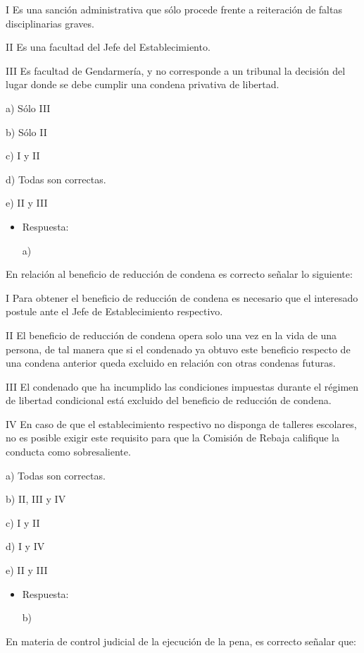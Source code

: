 \documentclass[letterpaper, 11pt]{article}
\begin{document}
I Es una sanción administrativa que sólo procede frente a reiteración
de faltas disciplinarias graves.

II Es una facultad del Jefe del Establecimiento.

III Es facultad de Gendarmería, y no corresponde a un tribunal la
decisión del lugar donde se debe cumplir una condena privativa de
libertad.

a) Sólo III

b) Sólo II

c) I y II

d) Todas son correctas.


e) II y III

\begin{itemize}
\item Respuesta:

a)
\end{itemize}


En relación al beneficio de reducción de condena es correcto señalar
lo siguiente:


I Para obtener el beneficio de reducción de condena es necesario que
el interesado postule ante el Jefe de Establecimiento respectivo.

II El beneficio de reducción de condena opera solo una vez en la vida
de una persona, de tal manera que si el condenado ya obtuvo este
beneficio respecto de una condena anterior queda excluido en relación
con otras condenas futuras.

III El condenado que ha incumplido las condiciones impuestas durante
el régimen de libertad condicional está excluido del beneficio de
reducción de condena.

IV En caso de que el establecimiento respectivo no disponga de
talleres escolares, no es posible exigir este requisito para que la
Comisión de Rebaja califique la conducta como sobresaliente.


a) Todas son correctas.


b) II, III y IV

c) I y II

d) I y IV

e) II y III

\begin{itemize}
\item Respuesta:

b)
\end{itemize}


En materia de control judicial de la ejecución de la pena, es correcto
señalar que:
\end{document}
